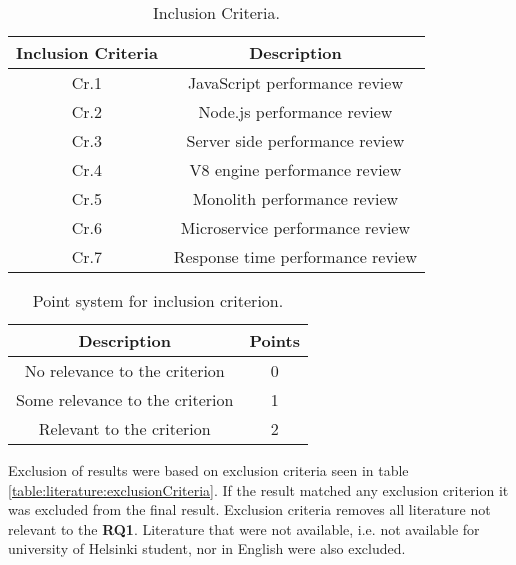 \begin{table}[ht!]
    \begin{tabular}{|c c|} 
        \hline
        Inclusion Criteria 
        & Description \\ [0.5ex] 
        \hline\hline
        Cr.1
        & JavaScript performance review
        \\ 
        
        Cr.2
        & Node.js performance review  \\ 
        
        Cr.3
        & Server side performance review  \\ 
        
        Cr.4
        & V8 engine performance review  \\ 
        
        Cr.5
        & Monolith performance review  \\ 
        
        Cr.6
        & Microservice performance review  \\ 
        
        Cr.7
        & Response time performance review  \\ 
        \hline
    \end{tabular}    
    \caption{Inclusion Criteria.}
    \label{table:literature:inclusionCriteria}
\end{table}

\begin{table}[ht!]
    \begin{tabular}{|c c|}
        \hline
        Description & Points \\ [0.5ex] 
        \hline\hline
         No relevance to the criterion & 0  \\ 
        
        Some relevance to the criterion & 1 \\ 
        
        Relevant to the criterion & 2 \\ 
        \hline
    \end{tabular}
    \caption{Point system for inclusion criterion.}
    \label{table:literature:pointSystem}
\end{table}

Exclusion of results were based on exclusion criteria seen in table \ref{table:literature:exclusionCriteria}.
If the result matched any exclusion criterion it was excluded from the final result.
Exclusion criteria removes all literature not relevant to the \textbf{RQ1}.
Literature that were not available, i.e. not available for university of Helsinki student, nor in English were also excluded.

